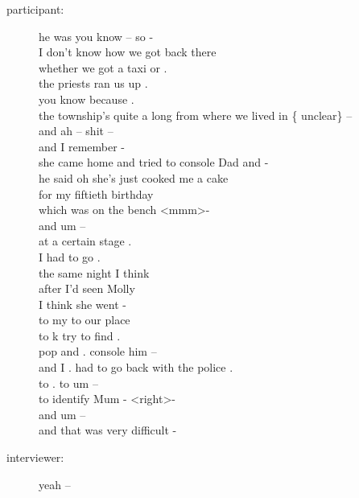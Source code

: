 \documentclass{article}
\newcommand{\turn}[2]{
\item[#1:] #2
}
\begin{document}
\begin{description}
\turn{participant}{he was you know -- so -\\
I don't know how we got back there\\
whether we got a taxi or .\\
the priests ran us up .\\
you know because .\\
the township's quite a long from where we lived in \{ unclear\}  --\\
and ah -- shit --\\
and I remember -\\
she came home and tried to console Dad and -\\
he said oh she's just cooked me a cake\\
for my fiftieth birthday\\
which was on the bench \textless mmm\textgreater  -\\
and um --\\
at a certain stage .\\
I had to go .\\
the same night I think\\
after I'd seen Molly\\
I think she went -\\
to my to our place\\
to k try to find .\\
pop and . console him --\\
and I . had to go back with the police .\\
to . to um --\\
to identify Mum - \textless right\textgreater  -\\
and um --\\
and that was very difficult -}

\turn{interviewer}{yeah --}


\end{description}
\end{document}
